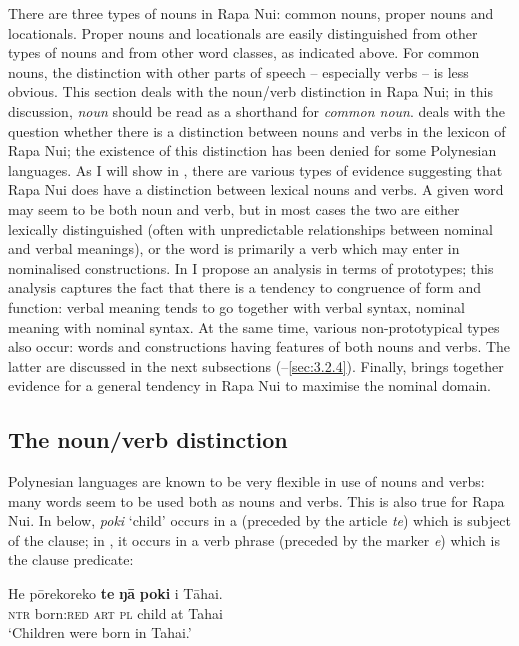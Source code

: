 There are three types of nouns in Rapa Nui: common nouns, proper nouns and locationals. Proper nouns and locationals are easily distinguished from other types of nouns and from other word classes, as indicated above. For common nouns, the distinction with other parts of speech – especially verbs – is less obvious. This section deals with the noun/verb distinction in Rapa Nui; in this discussion, \textit{noun} should be read as a shorthand for \textit{common noun}.  deals with the question whether there is a distinction between nouns and verbs in the lexicon of Rapa Nui; the existence of this distinction has been denied for some Polynesian languages. As I will show in , there are various types of evidence suggesting that Rapa Nui does have a distinction between lexical nouns and verbs. A given word may seem to be both noun and verb, but in most cases the two are either lexically distinguished (often with unpredictable relationships between nominal and verbal meanings), or the word is primarily a verb which may enter in nominalised constructions. In  I propose an analysis in terms of prototypes; this analysis captures the fact that there is a tendency to congruence of form and function: verbal meaning tends to go together with verbal syntax, nominal meaning with nominal syntax. At the same time, various non-prototypical types also occur: words and constructions having features of both nouns and verbs. The latter are discussed in the\textsubscript{} next subsections (–\ref{sec:3.2.4}). Finally,  brings together evidence for a general tendency in Rapa Nui to maximise the nominal domain.

\subsection{The noun/verb distinction}\label{sec:3.2.1}

Polynesian languages are known to be very flexible in use of nouns and verbs: many words seem to be used both as nouns and verbs. This is also true for Rapa Nui. In  below, \textit{poki} ‘child’ occurs in a  (preceded by the article \textit{te}) which is subject of the clause; in , it occurs in a verb phrase (preceded by the  marker \textit{e}) which is the clause predicate:

\ea\label{ex:3.1}
\gll He pōrekoreko \textbf{te} \textbf{ŋā} \textbf{poki} {\ꞌ}i Tāhai.\\
\textsc{ntr} born:\textsc{red} \textsc{art} \textsc{pl} child at Tahai\\
\glt 
‘Children were born in Tahai.’ \textstyleExampleref{[Ley-4-08.10]}
\z

